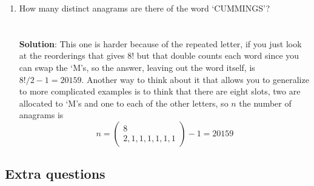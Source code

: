 \documentclass[11pt,a4paper]{scrartcl}
\begin{document}
\begin{enumerate}
\item How many distinct anagrams are there of the word
  `CUMMINGS'?\\ \\ \\ \textbf{Solution}: This one is harder because of
  the repeated letter, if you just look at the reorderings that gives
  $8!$ but that double counts each word since you can swap the `M's,
  so the answer, leaving out the word itself, is $8!/2
  -1=20159$. Another way to think about it that allows you to
  generalize to more complicated examples is to think that there are eight slots, two are allocated to `M's and one to each of the other letters, so $n$ the number of anagrams is
  \begin{equation}
    n=\left(\begin{array}{c}8\\2,1,1,1,1,1,1\end{array}\right)-1=20159
  \end{equation}
  


\end{enumerate}

\subsection*{Extra questions}
\end{document}
